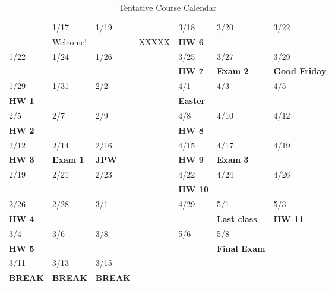 \documentclass[11pt]{article}
\begin{document}
\begin{table}[htbp]
\caption{Tentative Course Calendar}
\centering
\begin{tabular}{lllllll}
\hline
 & 1/17 & 1/19 &  & 3/18 & 3/20 & 3/22\\[0pt]
 & Welcome! &  & XXXXX & \textbf{HW 6} &  & \\[0pt]
\hline
1/22 & 1/24 & 1/26 &  & 3/25 & 3/27 & 3/29\\[0pt]
 &  &  &  & \textbf{HW 7} & \textbf{Exam 2} & \textbf{Good Friday}\\[0pt]
\hline
1/29 & 1/31 & 2/2 &  & 4/1 & 4/3 & 4/5\\[0pt]
\textbf{HW 1} &  &  &  & \textbf{Easter} &  & \\[0pt]
\hline
2/5 & 2/7 & 2/9 &  & 4/8 & 4/10 & 4/12\\[0pt]
\textbf{HW 2} &  &  &  & \textbf{HW 8} &  & \\[0pt]
\hline
2/12 & 2/14 & 2/16 &  & 4/15 & 4/17 & 4/19\\[0pt]
\textbf{HW 3} & \textbf{Exam 1} & \textbf{JPW} &  & \textbf{HW 9} & \textbf{Exam 3} & \\[0pt]
\hline
2/19 & 2/21 & 2/23 &  & 4/22 & 4/24 & 4/26\\[0pt]
 &  &  &  & \textbf{HW 10} &  & \\[0pt]
\hline
2/26 & 2/28 & 3/1 &  & 4/29 & 5/1 & 5/3\\[0pt]
\textbf{HW 4} &  &  &  &  & \textbf{Last class} & \textbf{HW 11}\\[0pt]
\hline
3/4 & 3/6 & 3/8 &  & 5/6 & 5/8 & \\[0pt]
\textbf{HW 5} &  &  &  &  & \textbf{Final Exam} & \\[0pt]
\hline
3/11 & 3/13 & 3/15 &  &  &  & \\[0pt]
\textbf{BREAK} & \textbf{BREAK} & \textbf{BREAK} &  &  &  & \\[0pt]
\hline
\end{tabular}
\end{table}
\end{document}
